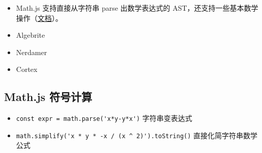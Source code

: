 
\begin{itemize}
\item Math.js 支持直接从字符串 parse 出数学表达式的 AST，还支持一些基本数学操作（\href{https://mathjs.org/docs/expressions/algebra.html}{文档}）。
\item Algebrite
\item Nerdamer
\item Cortex
\end{itemize}

\subsection{Math.js 符号计算}
\begin{itemize}
\item \verb`const expr = math.parse('x*y-y*x')` 字符串变表达式
\item \verb`math.simplify('x * y * -x / (x ^ 2)').toString()` 直接化简字符串数学公式
\end{itemize}
